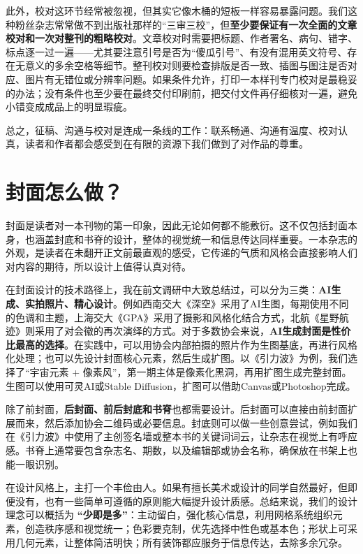 此外，校对这环节经常被忽视，但其实它像木桶的短板一样容易暴露问题。我们这种粉丝杂志常常做不到出版社那样的``三审三校''，但\textbf{至少要保证有一次全面的文章校对和一次对整刊的粗略校对}。文章校对时需要把标题、作者署名、病句、错字、标点逐一过一遍------尤其要注意引号是否为``傻瓜引号''、有没有混用英文符号、存在无意义的多余空格等细节。整刊校对则要检查排版是否一致、插图与图注是否对应、图片有无错位或分辨率问题。如果条件允许，打印一本样刊专门校对是最稳妥的办法；没有条件也至少要在最终交付印刷前，把交付文件再仔细核对一遍，避免小错变成成品上的明显瑕疵。

总之，征稿、沟通与校对是连成一条线的工作：联系畅通、沟通有温度、校对认真，读者和作者都会感受到在有限的资源下我们做到了对作品的尊重。

\section{封面怎么做？}\label{ux5c01ux9762ux600eux4e48ux505a}

封面是读者对一本刊物的第一印象，因此无论如何都不能敷衍。这不仅包括封面本身，也涵盖封底和书脊的设计，整体的视觉统一和信息传达同样重要。一本杂志的外观，是读者在未翻开正文前最直观的感受，它传递的气质和风格会直接影响人们对内容的期待，所以设计上值得认真对待。

在封面设计的技术路径上，我在前文调研中大致总结过，可以分为三类：\textbf{AI生成、实拍照片、精心设计}。例如西南交大《深空》采用了AI生图，每期使用不同的色调和主题，上海交大《GPA》采用了摄影和风格化结合方式，北航《星野航迹》则采用了对会徽的再次演绎的方式。对于多数协会来说，\textbf{AI生成封面是性价比最高的选择}。在实践中，可以用协会内部拍摄的照片作为生图基底，再进行风格化处理；也可以先设计封面核心元素，然后生成扩图。以《引力波》为例，我们选择了``宇宙元素
+
像素风''，第一期主体是像素化黑洞，再用扩图生成完整封面。生图可以使用可灵AI或Stable
Diffusion，扩图可以借助Canvas或Photoshop完成。

除了前封面，\textbf{后封面、前后封底和书脊}也都需要设计。后封面可以直接由前封面扩展而来，然后添加协会二维码或必要信息。封底则可以做一些创意尝试，例如我们在《引力波》中使用了主创签名墙或整本书的关键词词云，让杂志在视觉上有呼应感。书脊上通常要包含杂志名、期数，以及编辑部或协会名称，确保放在书架上也能一眼识别。

在设计风格上，主打一个丰俭由人。如果有擅长美术或设计的同学自然最好，但即便没有，也有一些简单可遵循的原则能大幅提升设计质感。总结来说，我们的设计理念可以概括为
\textbf{``少即是多''}：主动留白，强化核心信息，利用网格系统组织元素，创造秩序感和视觉统一；色彩要克制，优先选择中性色或基本色；形状上可采用几何元素，让整体简洁明快；所有装饰都应服务于信息传达，去除多余冗杂。

